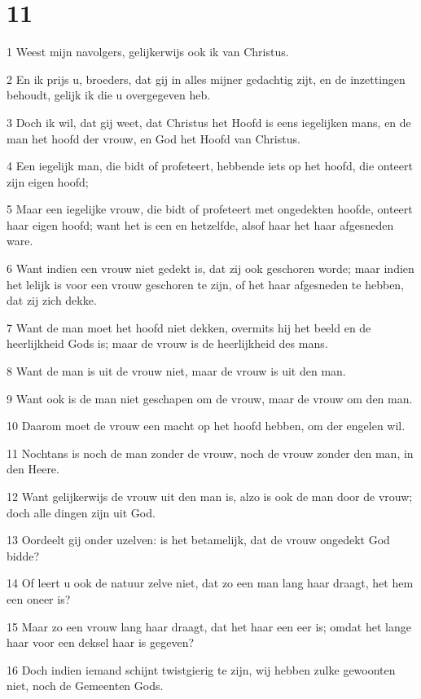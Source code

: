 \chapter{11}

\par 1 Weest mijn navolgers, gelijkerwijs ook ik van Christus.
\par 2 En ik prijs u, broeders, dat gij in alles mijner gedachtig zijt, en de inzettingen behoudt, gelijk ik die u overgegeven heb.
\par 3 Doch ik wil, dat gij weet, dat Christus het Hoofd is eens iegelijken mans, en de man het hoofd der vrouw, en God het Hoofd van Christus.
\par 4 Een iegelijk man, die bidt of profeteert, hebbende iets op het hoofd, die onteert zijn eigen hoofd;
\par 5 Maar een iegelijke vrouw, die bidt of profeteert met ongedekten hoofde, onteert haar eigen hoofd; want het is een en hetzelfde, alsof haar het haar afgesneden ware.
\par 6 Want indien een vrouw niet gedekt is, dat zij ook geschoren worde; maar indien het lelijk is voor een vrouw geschoren te zijn, of het haar afgesneden te hebben, dat zij zich dekke.
\par 7 Want de man moet het hoofd niet dekken, overmits hij het beeld en de heerlijkheid Gods is; maar de vrouw is de heerlijkheid des mans.
\par 8 Want de man is uit de vrouw niet, maar de vrouw is uit den man.
\par 9 Want ook is de man niet geschapen om de vrouw, maar de vrouw om den man.
\par 10 Daarom moet de vrouw een macht op het hoofd hebben, om der engelen wil.
\par 11 Nochtans is noch de man zonder de vrouw, noch de vrouw zonder den man, in den Heere.
\par 12 Want gelijkerwijs de vrouw uit den man is, alzo is ook de man door de vrouw; doch alle dingen zijn uit God.
\par 13 Oordeelt gij onder uzelven: is het betamelijk, dat de vrouw ongedekt God bidde?
\par 14 Of leert u ook de natuur zelve niet, dat zo een man lang haar draagt, het hem een oneer is?
\par 15 Maar zo een vrouw lang haar draagt, dat het haar een eer is; omdat het lange haar voor een deksel haar is gegeven?
\par 16 Doch indien iemand schijnt twistgierig te zijn, wij hebben zulke gewoonten niet, noch de Gemeenten Gods.
